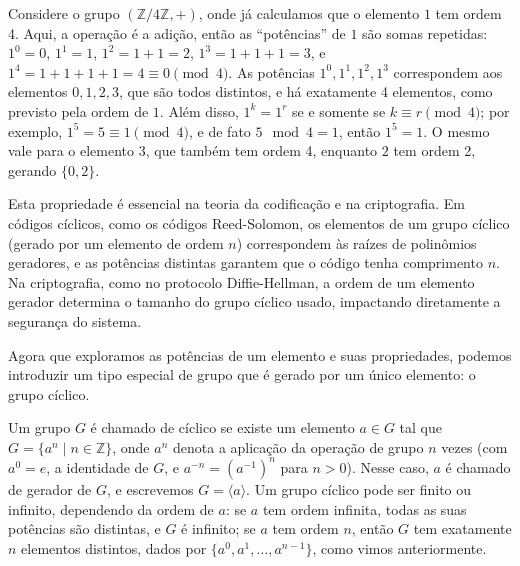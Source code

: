 \begin{example}
  Considere o grupo $(\mathbb{Z}/4\mathbb{Z}, +)$, onde já calculamos que o
  elemento $1$ tem ordem 4. Aqui, a operação é a adição, então as ``potências''
  de $1$ são somas repetidas: $1^0 = 0$, $1^1 = 1$, $1^2 = 1 + 1 = 2$, $1^3 = 1
  + 1 + 1 = 3$, e $1^4 = 1 + 1 + 1 + 1 = 4 \equiv 0 \pmod{4}$. As potências
  $1^0, 1^1, 1^2, 1^3$ correspondem aos elementos $0, 1, 2, 3$, que são todos
  distintos, e há exatamente 4 elementos, como previsto pela ordem de $1$. Além
  disso, $1^k = 1^r$ se e somente se $k \equiv r \pmod{4}$; por exemplo,
  $1^5 = 5 \equiv 1 \pmod{4}$, e de fato $5 \mod 4 = 1$, então $1^5 = 1$.
  O mesmo vale  para o elemento $3$, que também tem ordem 4, enquanto $2$ tem
  ordem 2, gerando $\{0, 2\}$.
\end{example}

\begin{remark}
  Esta propriedade é essencial na teoria da codificação e na criptografia. Em
  códigos cíclicos, como os códigos Reed-Solomon, os elementos de um grupo
  cíclico (gerado por um elemento de ordem $n$) correspondem às raízes de
  polinômios geradores, e as potências distintas garantem que o código tenha
  comprimento $n$. Na criptografia, como no protocolo Diffie-Hellman, a ordem
  de um elemento gerador determina o tamanho do grupo cíclico usado, impactando
  diretamente a segurança do sistema.
\end{remark}














Agora que exploramos as potências de um elemento e suas propriedades, podemos
introduzir um tipo especial de grupo que é gerado por um único elemento: o
grupo cíclico.

\begin{definition}
  Um grupo $G$ é chamado de cíclico se existe um elemento $a \in G$ tal
  que $G = \{ a^n \mid n \in \mathbb{Z} \}$, onde $a^n$ denota a aplicação da
  operação de grupo $n$ vezes (com $a^0 = e$, a identidade de $G$, e $a^{-n} =
  (a^{-1})^n$ para $n > 0$). Nesse caso, $a$ é chamado de gerador de
  $G$, e escrevemos $G = \langle a \rangle$. Um grupo cíclico pode ser finito
  ou infinito, dependendo da ordem de $a$: se $a$ tem ordem infinita, todas as
  suas potências são distintas, e $G$ é infinito; se $a$ tem ordem $n$, então
  $G$ tem exatamente $n$ elementos distintos, dados por $\{ a^0, a^1, \ldots, a^{n-1} \}$,
  como vimos anteriormente.
\end{definition}

